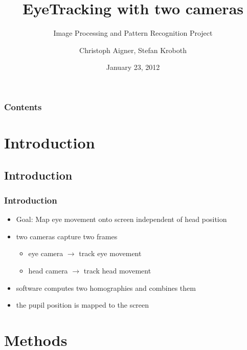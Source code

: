 \documentclass[%
14pt
]{beamer}
\title{EyeTracking with two cameras}
\subtitle{Image Processing and Pattern Recognition Project}
\author{Christoph Aigner, Stefan Kroboth}
\date{January 23, 2012}		%
\begin{document}

\begin{frame}[plain]
  \frametitle{}
  \titlepage %
\end{frame}



\begin{frame}
  \frametitle{Contents}
  \begin{spacing}{0.7}
        \tableofcontents[hideallsubsections %
                        ] %
                      \end{spacing}
\end{frame}

\section{Introduction}
\subsection{Introduction}
\begin{frame}
	\frametitle{Introduction}
  \begin{itemize}
    \item Goal: Map eye movement onto screen independent of head position
    \item two cameras capture two frames
      \begin{itemize}
        \item eye camera $\rightarrow$ track eye movement
        \item head camera $\rightarrow$ track head movement
      \end{itemize}
    \item software computes two homographies and combines them
    \item the pupil position is mapped to the screen
  \end{itemize}
\end{frame}

\section{Methods}
\end{document}
